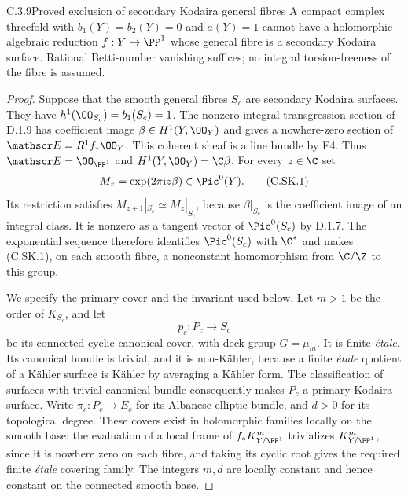 \begin{idstatement}{C.3.9}{Proved exclusion of secondary Kodaira general fibres}
\label{st:C.3.9}
A compact complex threefold with $b_1(Y)=b_2(Y)=0$ and
$a(Y)=1$ cannot have a holomorphic algebraic reduction
$f:Y\to\PP^1$ whose general fibre is a secondary Kodaira
surface. Rational Betti-number vanishing suffices; no integral
torsion-freeness of the fibre is assumed.
\end{idstatement}
\begin{proof}
Suppose that the smooth general fibres $S_c$ are secondary
Kodaira surfaces. They have $h^1(\OO_{S_c})=b_1(S_c)=1$.
The nonzero integral transgression section of D.1.9 has
coefficient image $\beta\in H^1(Y,\OO_Y)$ and gives a
nowhere-zero section of $\mathscr E=R^1f_*\OO_Y$.
This coherent sheaf is a line bundle by E4. Thus
$\mathscr E=\OO_{\PP^1}$ and
$H^1(Y,\OO_Y)=\C\beta$. For every $z\in\C$ set
\[
 M_z=\exp(2\pi\mathrm i z\beta)\in\Pic^0(Y).
\tag{C.SK.1}
\]
Its restriction satisfies $M_{z+1}|_{S_c}\simeq M_z|_{S_c}$,
because $\beta|_{S_c}$ is the coefficient image of an
integral class. It is nonzero as a tangent vector of
$\Pic^0(S_c)$ by D.1.7. The exponential sequence therefore
identifies $\Pic^0(S_c)$ with $\C^*$ and makes (C.SK.1), on
each smooth fibre, a nonconstant homomorphism from
$\C/\Z$ to this group.

We specify the primary cover and the invariant used below.
Let $m>1$ be the order of $K_{S_c}$, and let
\[
 p_c:P_c\longrightarrow S_c
\]
be its connected cyclic canonical cover, with deck group
$G=\mu_m$. It is finite \emph{\'etale}. Its canonical bundle
is trivial, and it is non-K\"ahler, because a finite
\emph{\'etale} quotient of a K\"ahler surface is K\"ahler
by averaging a K\"ahler form. The classification of
surfaces with trivial canonical bundle consequently makes
$P_c$ a primary Kodaira surface. Write
$\pi_c:P_c\to E_c$ for its Albanese elliptic bundle, and
$d>0$ for its topological degree. These covers exist in
holomorphic families locally on the smooth base: the
evaluation of a local frame of $f_*K_{Y/\PP^1}^{m}$
trivializes $K_{Y/\PP^1}^{m}$, since it is nowhere zero on
each fibre, and taking its cyclic root gives the required
finite \emph{\'etale} covering family. The integers $m,d$
are locally constant and hence constant on the connected
smooth base.


\end{proof}
